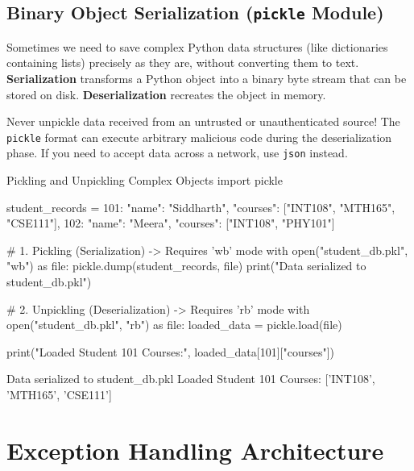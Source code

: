 \subsection{Binary Object Serialization (\texttt{pickle} Module)}

Sometimes we need to save complex Python data structures (like dictionaries containing lists) precisely as they are, without converting them to text. \textbf{Serialization} transforms a Python object into a binary byte stream that can be stored on disk. \textbf{Deserialization} recreates the object in memory.

\begin{commonmistake}
Never unpickle data received from an untrusted or unauthenticated source! The \texttt{pickle} format can execute arbitrary malicious code during the deserialization phase. If you need to accept data across a network, use \texttt{json} instead.
\end{commonmistake}

\begin{pythoncode}{Pickling and Unpickling Complex Objects}
import pickle

student_records = {
    101: {"name": "Siddharth", "courses": ["INT108", "MTH165", "CSE111"]},
    102: {"name": "Meera", "courses": ["INT108", "PHY101"]}
}

# 1. Pickling (Serialization) -> Requires 'wb' mode
with open("student_db.pkl", "wb") as file:
    pickle.dump(student_records, file)
print("Data serialized to student_db.pkl")

# 2. Unpickling (Deserialization) -> Requires 'rb' mode
with open("student_db.pkl", "rb") as file:
    loaded_data = pickle.load(file)

print("Loaded Student 101 Courses:", loaded_data[101]["courses"])
\end{pythoncode}
\begin{outputbox}
Data serialized to student_db.pkl
Loaded Student 101 Courses: ['INT108', 'MTH165', 'CSE111']
\end{outputbox}

\section{Exception Handling Architecture}

